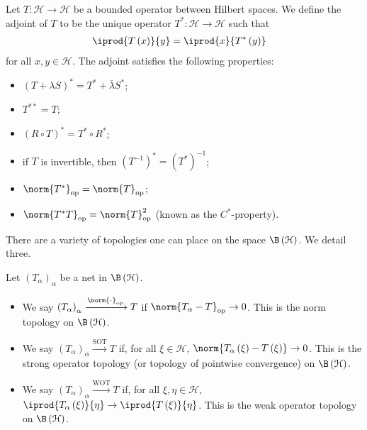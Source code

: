 \begin{definition}
  Let $T\colon \mathcal{H}\rightarrow \mathcal{H}$ be a bounded operator between Hilbert spaces. We define the adjoint of $T$ to be the unique operator $T^{\ast}\colon \mathcal{H}\rightarrow \mathcal{H}$ such that
  \begin{align*}
    \iprod{T\left(x\right)}{y} &= \iprod{x}{T^{\ast}\left(y\right)}
  \end{align*}
  for all $x,y\in \mathcal{H}$. The adjoint satisfies the following properties:
  \begin{itemize}
    \item $\left(T + \lambda S\right)^{\ast} = T^{\ast} + \overline{\lambda}S^{\ast}$;
    \item $T^{\ast\ast} = T$;
    \item $\left(R\circ T\right)^{\ast} = T^{\ast}\circ R^{\ast}$;
    \item if $T$ is invertible, then $\left(T^{-1}\right)^{\ast} = \left(T^{\ast}\right)^{-1}$;
    \item $\norm{T^{\ast}}_{\op} = \norm{T}_{\op}$;
    \item $\norm{T^{\ast}T}_{\op} = \norm{T}_{\op}^2$ (known as the $C^{\ast}$-property).
  \end{itemize}
\end{definition}
There are a variety of topologies one can place on the space $\B\left(\mathcal{H}\right)$. We detail three.
\begin{definition}
  Let $\left(T_{\alpha}\right)_{\alpha}$ be a net in $\B\left(\mathcal{H}\right)$.
  \begin{itemize}
    \item We say $\left(T_{\alpha}\right)_{\alpha}\xrightarrow{\norm{\cdot}_{\op}} T$ if $\norm{T_{\alpha} - T}_{\op}\rightarrow 0$. This is the norm topology on $\B\left(\mathcal{H}\right)$.
    \item We say $\left(T_{\alpha}\right)_{\alpha}\xrightarrow{ \text{SOT} } T$ if, for all $\xi\in \mathcal{H}$, $\norm{T_{\alpha}\left(\xi\right) - T\left(\xi\right)}\rightarrow 0$. This is the strong operator topology (or topology of pointwise convergence) on $\B\left(\mathcal{H}\right)$.
    \item We say $\left(T_{\alpha}\right)_{\alpha}\xrightarrow{\text{WOT}}T$ if, for all $\xi,\eta\in \mathcal{H}$, $ \iprod{T_{\alpha}\left(\xi\right)}{\eta}\rightarrow \iprod{T\left(\xi\right)}{\eta} $. This is the weak operator topology on $\B\left(\mathcal{H}\right)$.
  \end{itemize}
\end{definition}

